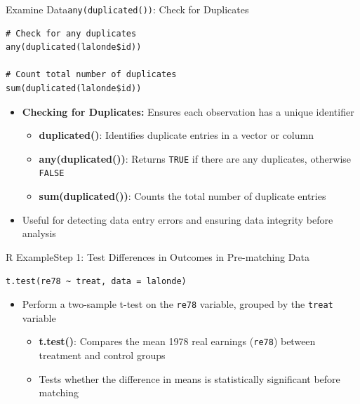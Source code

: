 \documentclass[hyperref={pdfpagelabels=false}]{beamer}
\begin{document}
\begin{frame}[fragile]{Examine Data}{\texttt{any(duplicated())}: Check for Duplicates}
\begin{lstlisting}
# Check for any duplicates
any(duplicated(lalonde$id))

# Count total number of duplicates
sum(duplicated(lalonde$id))
\end{lstlisting}
\begin{itemize}
	\vspace{0.2cm}
	\item \textbf{Checking for Duplicates:} Ensures each observation has a unique identifier
	\vspace{0.2cm}
	\begin{itemize}
		\item \textbf{duplicated()}: Identifies duplicate entries in a vector or column
		\vspace{0.2cm}
		\item \textbf{any(duplicated())}: Returns \texttt{TRUE} if there are any duplicates, otherwise \texttt{FALSE}
		\vspace{0.2cm}
		\item \textbf{sum(duplicated())}: Counts the total number of duplicate entries
	\end{itemize}
	\vspace{0.2cm}
	\item Useful for detecting data entry errors and ensuring data integrity before analysis
\end{itemize}
\end{frame}





\begin{frame}[fragile]{R Example}{Step 1: Test Differences in Outcomes in Pre-matching Data}
\begin{lstlisting}
t.test(re78 ~ treat, data = lalonde)
\end{lstlisting}
\begin{itemize}
	\vspace{0.2cm}
	\item Perform a two-sample t-test on the \texttt{re78} variable, grouped by the \texttt{treat} variable
	\vspace{0.2cm}
	\begin{itemize}
		\item \textbf{t.test()}: Compares the mean 1978 real earnings (\texttt{re78}) between treatment and control groups
		\vspace{0.2cm}
		\item Tests whether the difference in means is statistically significant before matching
	\end{itemize}
\end{itemize}
\end{frame}
\end{document}
